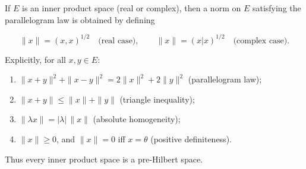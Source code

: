 If $E$ is an inner product space (real or complex), then a norm on $E$ satisfying the parallelogram law is obtained by defining

$$\|x\| = (x, x)^{1/2} \quad \text{(real case)}, \qquad \|x\| = (x|x)^{1/2} \quad \text{(complex case)}.$$

Explicitly, for all $x, y \in E$:

\begin{enumerate}
\item[(i)] $\|x + y\|^2 + \|x - y\|^2 = 2\|x\|^2 + 2\|y\|^2$ (parallelogram law);
\item[(ii)] $\|x + y\| \leq \|x\| + \|y\|$ (triangle inequality);
\item[(iii)] $\|\lambda x\| = |\lambda|\,\|x\|$ (absolute homogeneity);
\item[(iv)] $\|x\| \geq 0$, and $\|x\| = 0$ iff $x = \theta$ (positive definiteness).
\end{enumerate}

Thus every inner product space is a pre-Hilbert space.
